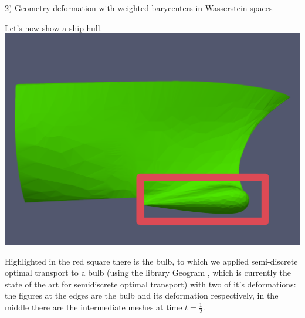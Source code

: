 \documentclass[b0paper,portrait]{baposter}
\begin{document}
\begin{poster}
\begin{posterbox}[name=otm,below=introduction,span=6,column=0]{2) Geometry deformation with weighted barycenters in Wasserstein spaces}
\begin{minipage}{0.48\textwidth}
\end{minipage}
\hspace{.2cm}
\begin{minipage}{0.46\textwidth}
\begin{minipage}{0.50\textwidth}
Let's now show a ship hull.\\
\includegraphics[scale=0.098]{ship} 
\end{minipage}
\begin{minipage}{0.50\textwidth}
Highlighted in the red square there is the bulb, to which we applied semi-discrete optimal transport to a bulb (using the library Geogram \cite{geogram}, which is currently the state of the art for semidiscrete optimal transport) with two of it's deformations: the  figures at the edges are the bulb and its deformation respectively, in the middle there are the intermediate meshes at time $t=\frac{1}{2}$.
\end{minipage}


\end{minipage}
\end{posterbox}
\end{poster}
\end{document}
